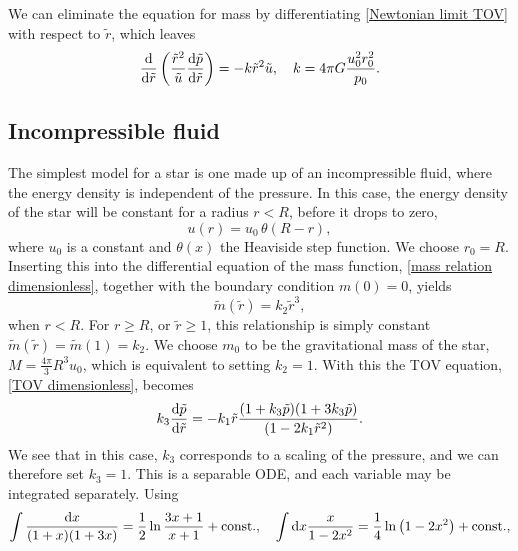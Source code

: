 We can eliminate the equation for mass by differentiating \autoref{Newtonian limit TOV} with respect to $\tilde r$, which leaves
%
\begin{equation}
    \diff{}{\tilde r} 
    \left( \frac{\tilde r^2}{\tilde u} \diff{\tilde p}{\tilde r}\right) 
    = -  k \tilde r^2  \tilde u, \quad
    k = 4 \pi G \frac{u_0^2 r^2_0}{p_0}.
\end{equation}



\subsection{Incompressible fluid}

The simplest model for a star is one made up of an incompressible fluid, where the energy density is independent of the pressure.
In this case, the energy density of the star will be constant for a radius $r < R$, before it drops to zero,
%
\begin{equation}
    u(r) = u_0 \, \theta (R- r),
\end{equation}
%
where $u_0$ is a constant and $\theta(x)$ the Heaviside step function.
We choose $r_0 = R$.
Inserting this into the differential equation of the mass function, \autoref{mass relation dimensionless}, together with the boundary condition $m(0) = 0$, yields
%
\begin{equation}
    \tilde m(\tilde r) = k_2 \tilde r^3,
\end{equation}
%
when $r < R$.
For $r \geq R$, or $\tilde r \geq 1$, this relationship is simply constant $\tilde m(\tilde r) = \tilde m(1) = k_2$.
We choose $m_0$ to be the gravitational mass of the star, $M = \frac{4 \pi }{3} R^3 u_0$, which is equivalent to setting $k_2 = 1$.
With this the TOV equation, \autoref{TOV dimensionless}, becomes
%
\begin{equation} 
    k_3 \diff{\tilde p}{\tilde r} 
    = - k_1 \tilde r 
    \frac{(1 + k_3 \tilde p)(1 + 3 k_3 \tilde p)}{(1 - 2 k_1 \tilde r^2)}.
\end{equation}
%
We see that in this case, $k_3$ corresponds to a scaling of the pressure, and we can therefore set $k_3 = 1$.
This is a separable ODE, and each variable may be integrated separately.
Using
%
\begin{align}
    \int \frac{\text{d} x}{(1 + x)(1 + 3x)}
    = \frac{1}{2} \ln \frac{3x + 1}{x + 1} + \mathrm{const.} , \quad
    \int \text{d} x \frac{x}{1 - 2 x^2} 
    = \frac{1}{4}\ln\left(1 - 2 x^2 \right)
    + \mathrm{const.},
\end{align}
